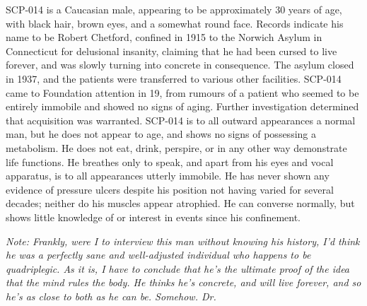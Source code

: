 SCP-014 is a Caucasian male, appearing to be approximately 30 years of age, with black hair, brown eyes, and a somewhat round face. Records indicate his name to be Robert Chetford, confined in 1915 to the Norwich Asylum in Connecticut for delusional insanity, claiming that he had been cursed to live forever, and was slowly turning into concrete in consequence. The asylum closed in 1937, and the patients were transferred to various other facilities. SCP-014 came to Foundation attention in 19, from rumours of a patient who seemed to be entirely immobile and showed no signs of aging. Further investigation determined that acquisition was warranted.
\newpage
SCP-014 is to all outward appearances a normal man, but he does not appear to age, and shows no signs of possessing a metabolism. He does not eat, drink, perspire, or in any other way demonstrate life functions. He breathes only to speak, and apart from his eyes and vocal apparatus, is to all appearances utterly immobile. He has never shown any evidence of pressure ulcers despite his position not having varied for several decades; neither do his muscles appear atrophied. He can converse normally, but shows little knowledge of or interest in events since his confinement.

\linebreak
\textsl{Note: Frankly, were I to interview this man without knowing his history, I'd think he was a perfectly sane and well-adjusted individual who happens to be quadriplegic. As it is, I have to conclude that he's the ultimate proof of the idea that the mind rules the body. He thinks he's concrete, and will live forever, and so he's as close to both as he can be. Somehow. Dr. }